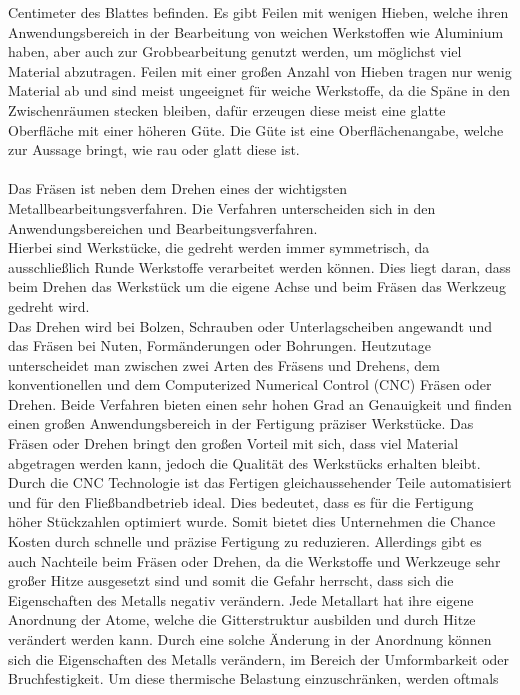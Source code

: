 Centimeter des Blattes befinden. Es gibt Feilen mit wenigen Hieben, welche ihren Anwendungsbereich in der Bearbeitung von weichen Werkstoffen wie 
Aluminium haben, aber auch zur Grobbearbeitung genutzt werden, um möglichst viel Material abzutragen. Feilen mit einer großen Anzahl von Hieben tragen
nur wenig Material ab und sind meist ungeeignet für weiche Werkstoffe, da die Späne in den Zwischenräumen stecken bleiben, dafür erzeugen diese meist eine 
glatte Oberfläche mit einer höheren Güte. Die Güte ist eine Oberflächenangabe, welche zur Aussage bringt, wie rau oder glatt diese ist. \autocite{Forster.2018}
\\\\
Das Fräsen ist neben dem Drehen eines der wichtigsten Metallbearbeitungsverfahren. Die Verfahren unterscheiden sich in den Anwendungsbereichen und 
Bearbeitungsverfahren. 
\\
Hierbei sind Werkstücke, die gedreht werden immer symmetrisch, da ausschließlich Runde Werkstoffe verarbeitet werden können. Dies liegt daran, dass beim 
Drehen das Werkstück um die eigene Achse und beim Fräsen das Werkzeug gedreht wird. 
\\
Das Drehen wird \zB bei Bolzen, Schrauben oder Unterlagscheiben angewandt und das Fräsen bei \zB Nuten, Formänderungen oder Bohrungen. Heutzutage unterscheidet
man zwischen zwei Arten des Fräsens und Drehens, dem konventionellen und dem Computerized Numerical Control (CNC) Fräsen oder Drehen. Beide Verfahren bieten
einen sehr hohen Grad an Genauigkeit und finden einen großen Anwendungsbereich in der Fertigung präziser Werkstücke. Das Fräsen oder Drehen bringt den 
großen Vorteil mit sich, dass viel Material abgetragen werden kann, jedoch die Qualität des Werkstücks erhalten bleibt. Durch die CNC Technologie ist das 
Fertigen gleichaussehender Teile automatisiert und für den Fließbandbetrieb ideal. Dies bedeutet, dass es für die Fertigung höher Stückzahlen optimiert 
wurde. Somit bietet dies Unternehmen die Chance Kosten durch schnelle und präzise Fertigung zu reduzieren. Allerdings gibt es auch Nachteile beim Fräsen 
oder Drehen, da die Werkstoffe und Werkzeuge sehr großer Hitze ausgesetzt sind und somit die Gefahr
herrscht, dass sich die Eigenschaften \zB des Metalls negativ verändern. Jede Metallart hat ihre eigene Anordnung der
Atome, welche die Gitterstruktur ausbilden und durch Hitze verändert werden kann. Durch eine solche Änderung in der Anordnung können sich die 
Eigenschaften des Metalls verändern, \zB im Bereich der Umformbarkeit oder Bruchfestigkeit. Um diese thermische Belastung einzuschränken, werden oftmals 

